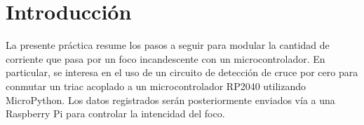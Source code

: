 %
%


\section{Introducción}%
\label{seq:introduction}
La presente práctica resume los pasos a seguir para modular la cantidad de corriente que pasa por un foco incandescente con un microcontrolador.
En particular, se interesa en el uso de un circuito de detección de cruce por cero para conmutar un triac acoplado a un microcontrolador RP2040 utilizando MicroPython.
Los datos registrados serán posteriormente enviados vía \IIC a una Raspberry Pi para controlar la intencidad del foco.







